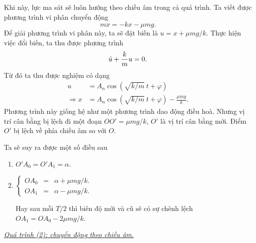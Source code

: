 Khi này, lực ma sát sẽ luôn hướng theo chiều âm trong cả quá trình. Ta viết được phương trình vi phân chuyển động
\begin{equation}
    m \ddot{x} =  - k x - \mu  m g.
    \label{eq:1.4}
\end{equation}
Để giải phương trình vi phân này, ta sẽ đặt biến là $u = x + \mu mg/k$. Thực hiện việc đổi biến, ta thu được phương trình
\begin{equation*}
    \ddot{u} + {\frac{k}{m} \displaystyle} u = 0.
\end{equation*}
Từ đó ta thu được nghiệm có dạng
\begin{equation}
    \begin{split}
        u &= A_n \cos{\left(\sqrt{k/m} \ t + \varphi \right)} \\
        \Rightarrow x &= A_n \cos{\left(\sqrt{k/m} \ t + \varphi \right)} - {\displaystyle \frac{\mu m g}{k}}.
    \end{split}
    \label{eq:1.5}
\end{equation}
Phương trình này giống hệ như một phương trình dao động điều hoà. Nhưng vị trí cân bằng bị lệch đi một đoạn $OO' = \mu m g/k$, $O'$ là vị trí cân bằng mới. Điểm $O'$ bị lệch về phía chiều âm so với $O$.
\begin{figure}[!htb]
    \centering
    
    \caption{}
    \label{fig:1.3}
\end{figure}

Ta sẽ suy ra được một số điều sau
\begin{enumerate}
    \item \(O'A_0 = O'A_1 = \alpha\).
    \item 
    \(
    \left\{
        \begin{array}{ccc}
        OA_0 &=& \alpha + \mu mg/k. \\ 
        OA_1 &=& \alpha - \mu mg/k.
        \end{array}
    \right.
    \)
    
    Hay sau mỗi \(T/2\) thì biên độ mới và cũ sẽ có sự chênh lệch
    \(OA_1 = OA_0 - 2 \mu mg/k\).
\end{enumerate}
\vspace{2mm}

\underline{\textit{Quá trình (2): chuyển động theo chiều âm.}}
\vspace{2mm}


